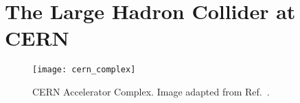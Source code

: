 \section{The Large Hadron Collider at CERN}

\begin{figure}[htbp]
  \centering

  \texttt{[image: cern\_complex]}

  \caption{CERN Accelerator Complex. Image adapted from
    Ref.~\cite{Mobs:2684277}.}%
  \label{fig:bla}
\end{figure}

